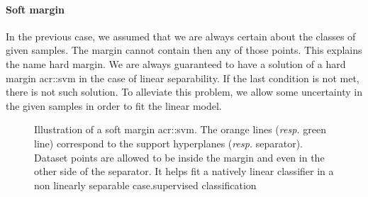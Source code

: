             \paragraph{Soft margin}
                In the previous case, we assumed that we are always certain about the classes of given samples.
                The margin cannot contain then any of those points.
                This explains the name hard margin.
                We are always guaranteed to have a solution of a hard margin \gls{acr::svm} in the case of linear separability.
                If the last condition is not met, there is not such solution.
                To alleviate this problem, we allow some uncertainty in the given samples in order to fit the linear model.\\

                \begin{figure}
                    \centering
                    
                    \caption{
                        \label{fig::soft_margin} Illustration of a soft margin \gls{acr::svm}.
                        The orange lines (\textit{resp.} green line) correspond to the support hyperplanes (\textit{resp.} separator).
                        Dataset points are allowed to be inside the margin and even in the other side of the separator.
                        It helps fit a natively linear classifier in a non linearly separable case.supervised classification
                    }
                \end{figure}


